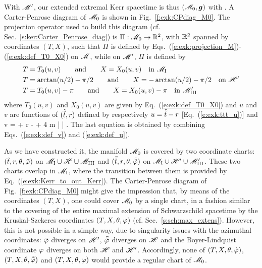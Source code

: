 With $\mathscr{M}'$, our extended extremal Kerr spacetime is thus $(\mathscr{M}_0,\bm{g})$ with
\be
    .
\ee
A Carter-Penrose diagram of $\mathscr{M}_0$ is shown in Fig.~\ref{f:exk:CPdiag_M0}.
The projection operator used to build this diagram (cf. Sec.~\ref{s:ker:Carter_Penrose_diag})
is $\Pi : \mathscr{M}_0 \to \mathbb{R}^2$, with $\mathbb{R}^2$ spanned by coordinates $(T,X)$,
such that $\Pi$ is defined by Eqs.~(\ref{e:exk:projection_M})-(\ref{e:exk:def_T0_X0})
on $\mathscr{M}$, while on $\mathscr{M}'$, $\Pi$ is defined by
\begin{subequations}
\begin{align}
   & T = T_0(u, v) \qand X = X_0(u, v) \quad\mbox{in}\ \M_{\rm I} \\
   & T = \arctan(u/2) - \pi/2 \qand X = -\arctan(u/2) - \pi/2 \quad\mbox{on} \ \Hor' \\
   & T = T_0(u, v) - \pi \qand X = X_0(u, v) - \pi \quad\mbox{in}\ \M'_{\rm III}
\end{align}
\end{subequations}
where $T_0(u,v)$ and $X_0(u,v)$ are given by Eq.~(\ref{e:exk:def_T0_X0})
and $u$ and $v$ are functions of $(\tilde{{\tilde t}}, r)$ defined by
respectively $u = \tilde{{\tilde t}} - r$ [Eq.~(\ref{e:exk:ttt_u})]
and
\be
    v = \tilde{\ti} + r -  + 4 m \ln \left|  \right| .
\ee
The last equation is obtained by combining Eqs.~(\ref{e:exk:def_v}) and (\ref{e:exk:def_u}).


\begin{remark}
As we have constructed it, the manifold $\mathscr{M}_0$ is covered by two coordinate charts:
$({\tilde t}, r, \theta, {\tilde\varphi})$ on $\mathscr{M}_{\rm I} \cup \mathscr{H} \cup \mathscr{M}_{\rm III}$
and $(\tilde{{\tilde t}}, r, \theta, \tilde{{\tilde\varphi}})$ on $\mathscr{M}_{\rm I} \cup \mathscr{H}' \cup \mathscr{M}'_{\rm III}$.
These two charts overlap in $\mathscr{M}_{\rm I}$, where the transition between them
is provided by Eq.~(\ref{e:exk:Kerr_to_out_Kerr}).
The Carter-Penrose diagram of Fig.~\ref{f:exk:CPdiag_M0} might give the impression
that, by means of the coordinates $(T,X)$, one could cover $\mathscr{M}_0$ by a single chart,
in a fashion similar to the covering of the entire maximal extension of Schwarzschild
spacetime by the Kruskal-Szekeres coordinates
$(T,X,\theta,\varphi)$ (cf. Sec.~\ref{s:sch:max_extens}). However, this is not possible
in a simple way, due to singularity issues with the azimuthal coordinates:
${\tilde\varphi}$ diverges on $\mathscr{H}'$, $\tilde{{\tilde\varphi}}$ diverges on $\mathscr{H}$ and
the Boyer-Lindquist coordinate $\varphi$ diverges on both $\mathscr{H}$ and $\mathscr{H}'$.
Accordingly, none of $(T,X,\theta,{\tilde\varphi})$, $(T,X,\theta,\tilde{{\tilde\varphi}})$ and
$(T,X,\theta,\varphi)$ would provide a regular chart of $\mathscr{M}_0$.
\end{remark}

